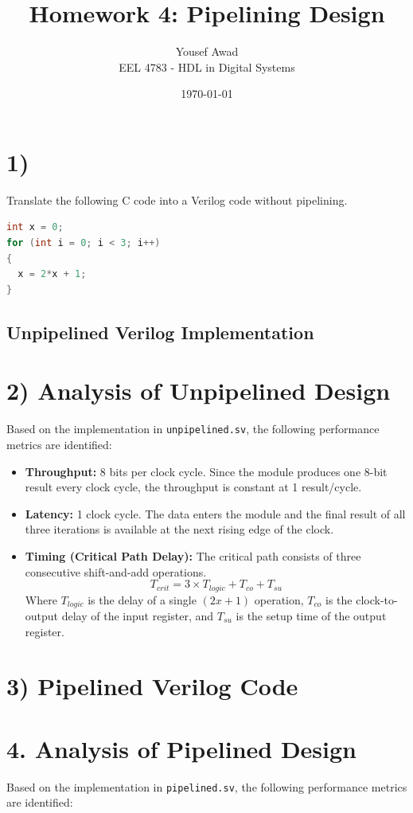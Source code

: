\documentclass[11pt, letterpaper]{article}
\title{Homework 4: Pipelining Design}
\author{Yousef Awad \\ EEL 4783 - HDL in Digital Systems}
\date{\today}
\begin{document}
\maketitle

\section*{1)}
Translate the following C code into a Verilog code without pipelining.
\begin{lstlisting}[language=C]
int x = 0;
for (int i = 0; i < 3; i++)
{
  x = 2*x + 1;
}
\end{lstlisting}

\subsection*{Unpipelined Verilog Implementation}


\pagebreak
\section*{2) Analysis of Unpipelined Design}
Based on the implementation in \texttt{unpipelined.sv}, the following performance metrics are identified:

\begin{itemize}
    \item \textbf{Throughput:} 8 bits per clock cycle. Since the module produces one 8-bit result every clock cycle, the throughput is constant at 1 result/cycle.
    \item \textbf{Latency:} 1 clock cycle. The data enters the module and the final result of all three iterations is available at the next rising edge of the clock.
    \item \textbf{Timing (Critical Path Delay):} The critical path consists of three consecutive shift-and-add operations. 
    \[ T_{crit} = 3 \times T_{logic} + T_{co} + T_{su} \]
    Where $T_{logic}$ is the delay of a single $(2x+1)$ operation, $T_{co}$ is the clock-to-output delay of the input register, and $T_{su}$ is the setup time of the output register.
\end{itemize}

\section*{3) Pipelined Verilog Code}


\pagebreak
\section*{4. Analysis of Pipelined Design}
Based on the implementation in \texttt{pipelined.sv}, the following performance metrics are identified:
\end{document}
